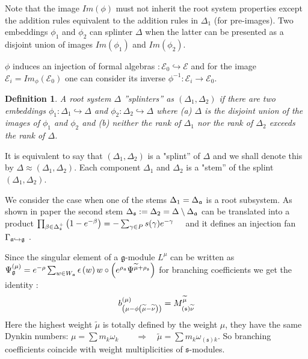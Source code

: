 \documentclass[12pt]{article}
\newtheorem{Def}{Definition}[section]
\newcommand{\gf}{\mathfrak{g}}
\newcommand{\sfr}{\mathfrak{s}}
\begin{document}
Note that the image $Im(\phi)$ must not inherit the root system properties except the addition rules
equivalent to the addition rules in $\Delta_{1}$ (for pre-images). Two embeddings $\phi_1$ and
$\phi_2$ can splinter $\Delta$ when the latter can be presented as a disjoint union of images
$Im(\phi_1)$ and $Im(\phi_2)$.

$\phi$ induces an injection of formal algebras $:{\mathcal{E}}_0
\hookrightarrow \mathcal{E}$ and for the image ${\mathcal{E}}%
_i=Im_{\phi}\left( {\mathcal{E}}_0\right)$ one can consider its inverse $%
\phi^{-1}:{\mathcal{E}}_i \longrightarrow {\mathcal{E}}_0$.

\begin{Def}
  A root system $\Delta $ ''splinters'' as $(\Delta _{1},\Delta _{2})$ if there are two embeddings
  $\phi _{1}:\Delta _{1}\hookrightarrow \Delta $ and $%
  \phi _{2}:\Delta _{2}\hookrightarrow \Delta $ where (a) $\Delta $ is the disjoint union of the
  images of $\phi _{1}$ and $\phi _{2}$ and (b) neither the rank of $\Delta _{1}$ nor the rank of
  $\Delta _{2}$ exceeds the rank of $%
  \Delta $.
\end{Def}

It is equivalent to say that $(\Delta_1,\Delta_2)$ is a "splint'' of $\Delta$ and we shall denote
this by $\Delta \approx (\Delta_1,\Delta_2)$. Each component $\Delta_1$ and $\Delta_2$ is a "stem''
of the splint $%
(\Delta_1,\Delta_2)$.

We consider the case when one of the stems $\Delta _{1}=\Delta _{\frak{a}}$ is a root subsystem. As shown in paper \cite{2011arXiv1111.6787L} the second stem $\Delta _{\frak{s}}:=\Delta
_{2}=\Delta \setminus \Delta _{\frak{a}}$ can be translated into a product
$\prod_{\beta \in \Delta _{\frak{s}}^{+}}\left( 1-e^{-\beta }\right)=-\sum_{\gamma \in P}s(\gamma )e^{-\gamma }\quad   \label{splint product}$
and it defines an injection fan $\Gamma _{\frak{a}%
\hookrightarrow \frak{g}}$ \cite{lyakhovsky1996rra,ilyin812pbc,2010arXiv1007.0318L}.

Since the singular element of a $\gf$-module $L^{\mu}$ can be
written as $\Psi _{\frak{g}}^{\left( \mu \right) }=e^{-\rho }
\sum_{w\in W_{\frak{a}}}\epsilon \left( w \right) w\circ \left(
e^{\rho _{\frak{a}}}\Psi ^{\widetilde{\mu }+\rho
_{\frak{s}}}\right)$  for branching coefficients we get the
identity \cite{2011arXiv1111.6787L}:
\begin{equation}
  \label{eq:9}
b_{\left( \mu -\phi \left( \widetilde{\mu }-\widetilde{\nu }\right) \right)
}^{(\mu )}=M_{\left( \frak{s}\right) \widetilde{\nu }}^{\widetilde{\mu }}  
\end{equation}
Here the highest weight $\widetilde{\mu }$ is totally defined by the weight $\mu $, they have the
same Dynkin numbers: $\mu =\sum m_{k}\omega _{k}\qquad \Longrightarrow \quad \widetilde{\mu }=\sum
m_{k}\omega_{(\sfr) k} . \label{new h weight}$ So branching coefficients coincide with weight
multiplicities of $\sfr$-modules.
\end{document}
